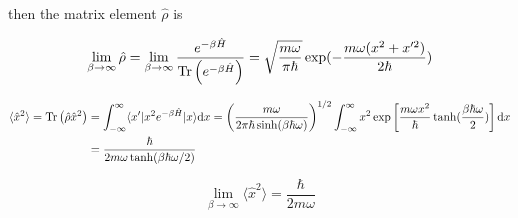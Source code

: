 then the matrix element $\hat{\rho}$ is

\begin{equation}
    \lim_{\beta\rightarrow\infty}\hat{\rho} = \lim_{\beta\rightarrow\infty}\frac{e^{-\beta\hat{H}}}{\operatorname{Tr}\left(e^{-\beta\hat{H}}\right)} = \sqrt{\frac{m\omega}{\pi\hbar}}\exp(-\frac{m\omega(x^2+x'^2)}{2\hbar})
\end{equation}

\begin{align}
    \begin{split}
        \langle \hat{x}^2\rangle = \operatorname{Tr}\left(\hat{\rho}\hat{x}^2\right) &= \int_{-\infty}^{\infty}\langle x'|x^2e^{-\beta\hat{H}}|x\rangle\mathrm{d}x = \left(\frac{m\omega}{2\pi\hbar\sinh(\beta\hbar\omega)}\right)^{1/2} \int_{-\infty}^{\infty} x^2\exp\left[\frac{m\omega x^2}{\hbar}\tanh(\frac{\beta\hbar\omega}{2})\right]\mathrm{d}x \\
        &= \frac{\hbar}{2m\omega\tanh(\beta\hbar\omega/2)}
    \end{split}
\end{align}

\begin{equation}
    \lim_{\beta\rightarrow\infty}\langle \hat{x}^2\rangle = \frac{\hbar}{2m\omega}\label{eq:3}
\end{equation}
